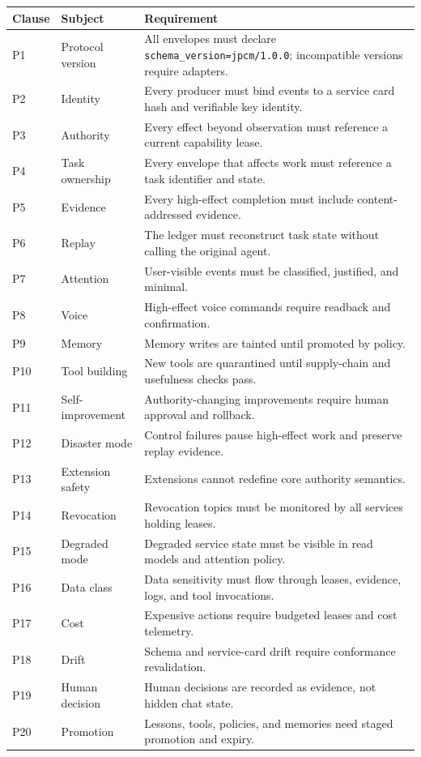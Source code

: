 \documentclass[10pt,journal,onecolumn]{IEEEtran}
\begin{document}
\begin{longtable}{P{0.06\textwidth} P{0.25\textwidth} P{0.58\textwidth}}
\toprule
Clause & Subject & Requirement \\
\midrule
P1 & Protocol version & All envelopes must declare \texttt{schema\_version=jpcm/1.0.0}; incompatible versions require adapters. \\
P2 & Identity & Every producer must bind events to a service card hash and verifiable key identity. \\
P3 & Authority & Every effect beyond observation must reference a current capability lease. \\
P4 & Task ownership & Every envelope that affects work must reference a task identifier and state. \\
P5 & Evidence & Every high-effect completion must include content-addressed evidence. \\
P6 & Replay & The ledger must reconstruct task state without calling the original agent. \\
P7 & Attention & User-visible events must be classified, justified, and minimal. \\
P8 & Voice & High-effect voice commands require readback and confirmation. \\
P9 & Memory & Memory writes are tainted until promoted by policy. \\
P10 & Tool building & New tools are quarantined until supply-chain and usefulness checks pass. \\
P11 & Self-improvement & Authority-changing improvements require human approval and rollback. \\
P12 & Disaster mode & Control failures pause high-effect work and preserve replay evidence. \\
P13 & Extension safety & Extensions cannot redefine core authority semantics. \\
P14 & Revocation & Revocation topics must be monitored by all services holding leases. \\
P15 & Degraded mode & Degraded service state must be visible in read models and attention policy. \\
P16 & Data class & Data sensitivity must flow through leases, evidence, logs, and tool invocations. \\
P17 & Cost & Expensive actions require budgeted leases and cost telemetry. \\
P18 & Drift & Schema and service-card drift require conformance revalidation. \\
P19 & Human decision & Human decisions are recorded as evidence, not hidden chat state. \\
P20 & Promotion & Lessons, tools, policies, and memories need staged promotion and expiry. \\
\bottomrule
\end{longtable}
\end{document}
